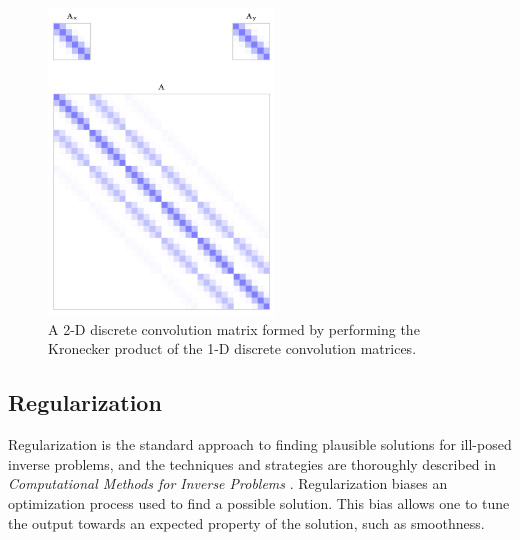 \documentclass[letterpaper, 11pt, titlepage, twocolumn]{article}
\def\figurewidthalt{6cm}
\begin{document}
\begin{figure}[H]
  \centering
  \includegraphics[width=\figurewidthalt]{2dkernel.png}
  \caption{A 2-D discrete convolution matrix formed by performing the Kronecker product of the 1-D discrete convolution matrices.}
  \label{fig:kronecker}
\end{figure}

\subsection{Regularization}
Regularization is the standard approach to finding plausible solutions for ill-posed inverse problems, and the techniques and strategies are thoroughly described in \emph{Computational Methods for Inverse Problems} \cite{vogel_computational_2002}. Regularization biases an optimization process used to find a possible solution. This bias allows one to tune the output towards an expected property of the solution, such as smoothness.
\end{document}

